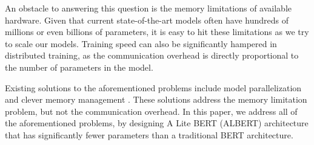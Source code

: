 An obstacle to answering this question is the memory limitations of available hardware.
Given that current state-of-the-art models often have hundreds of millions or even billions of parameters, it is easy to hit these limitations as we try to scale our models.
Training speed can also be significantly hampered in distributed training, as the communication overhead is directly proportional to the number of parameters in the model.







Existing solutions to the aforementioned problems include model parallelization \citep{shazeer2018mesh,shoeybi2019megatronlm} and clever memory management \citep{chen2016training,gomez2017reversible}.
These solutions address the memory limitation problem, but not the communication overhead.
In this paper, we address all of the aforementioned problems, by designing A Lite BERT (ALBERT) architecture that has significantly fewer parameters than a traditional BERT architecture. 


